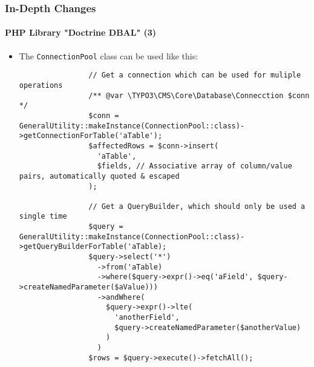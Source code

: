 \begin{frame}[fragile]
	\frametitle{In-Depth Changes}
	\framesubtitle{PHP Library "Doctrine DBAL" (3)}

	\lstset{basicstyle=\tiny\ttfamily}

	\begin{itemize}

		\item The \texttt{ConnectionPool} class can be used like this:
			\begin{lstlisting}
				// Get a connection which can be used for muliple operations
				/** @var \TYPO3\CMS\Core\Database\Connecction $conn */
				$conn = GeneralUtility::makeInstance(ConnectionPool::class)->getConnectionForTable('aTable');
				$affectedRows = $conn->insert(
				  'aTable',
				  $fields, // Associative array of column/value pairs, automatically quoted & escaped
				);

				// Get a QueryBuilder, which should only be used a single time
				$query = GeneralUtility::makeInstance(ConnectionPool::class)->getQueryBuilderForTable('aTable);
				$query->select('*')
				  ->from('aTable)
				  ->where($query->expr()->eq('aField', $query->createNamedParameter($aValue)))
				  ->andWhere(
					$query->expr()->lte(
					  'anotherField',
					  $query->createNamedParameter($anotherValue)
					)
				  )
				$rows = $query->execute()->fetchAll();
			\end{lstlisting}
	\end{itemize}

\end{frame}

